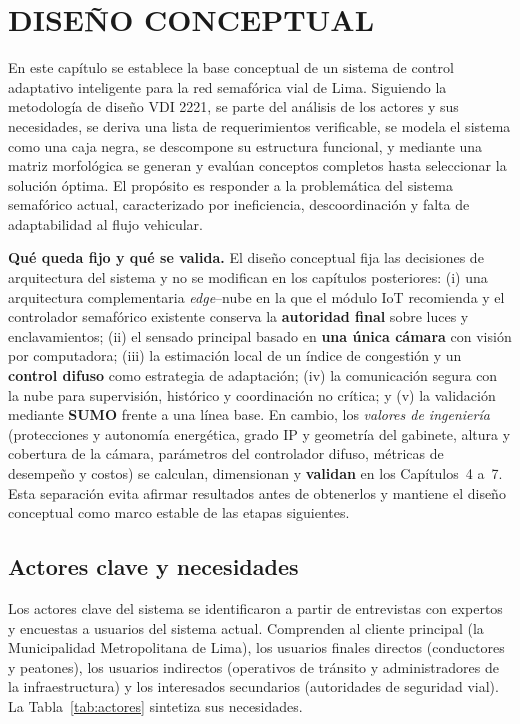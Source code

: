 \chapter{DISEÑO CONCEPTUAL}\label{cap:diseno-conceptual}

En este capítulo se establece la base conceptual de un sistema de control adaptativo inteligente para la red
semafórica vial de Lima. Siguiendo la metodología de diseño VDI 2221, se parte del análisis de los actores y
sus necesidades, se deriva una lista de requerimientos verificable, se modela el sistema como una caja negra,
se descompone su estructura funcional, y mediante una matriz morfológica se generan y evalúan conceptos
completos hasta seleccionar la solución óptima. El propósito es responder a la problemática del sistema
semafórico actual, caracterizado por ineficiencia, descoordinación y falta de adaptabilidad al flujo
vehicular.

\textbf{Qué queda fijo y qué se valida.} El diseño conceptual fija las decisiones de arquitectura del sistema
y no se modifican en los capítulos posteriores: (i) una arquitectura complementaria \emph{edge}--nube en la
que el módulo IoT recomienda y el controlador semafórico existente conserva la \textbf{autoridad final} sobre
luces y enclavamientos; (ii) el sensado principal basado en \textbf{una única cámara} con visión por
computadora; (iii) la estimación local de un índice de congestión y un \textbf{control difuso} como estrategia
de adaptación; (iv) la comunicación segura con la nube para supervisión, histórico y coordinación no crítica;
y (v) la validación mediante \textbf{SUMO} frente a una línea base. En cambio, los \emph{valores de
ingeniería} (protecciones y autonomía energética, grado IP y geometría del gabinete, altura y cobertura de la
cámara, parámetros del controlador difuso, métricas de desempeño y costos) se calculan, dimensionan y
\textbf{validan} en los Capítulos~4 a~7. Esta separación evita afirmar resultados antes de obtenerlos y
mantiene el diseño conceptual como marco estable de las etapas siguientes.

\section{Actores clave y necesidades}\label{sec:actores-necesidades}

Los actores clave del sistema se identificaron a partir de entrevistas con expertos y encuestas a usuarios del
sistema actual. Comprenden al cliente principal (la Municipalidad Metropolitana de Lima), los usuarios finales
directos (conductores y peatones), los usuarios indirectos (operativos de tránsito y administradores de la
infraestructura) y los interesados secundarios (autoridades de seguridad vial). La Tabla~\ref{tab:actores}
sintetiza sus necesidades.

